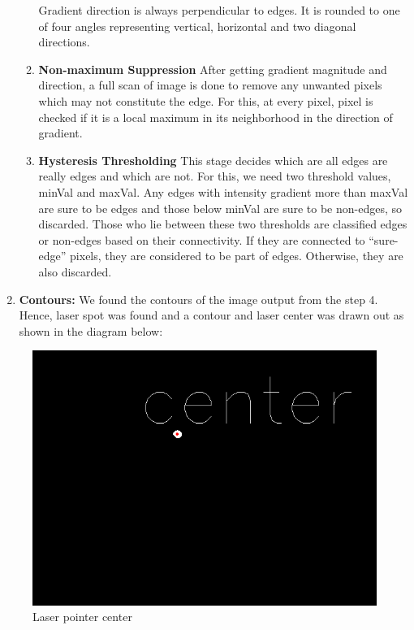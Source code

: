 \documentclass[12pt, a4paper]{article}
\begin{document}
\begin{enumerate}
\begin{enumerate}
Gradient direction is always perpendicular to edges. It is rounded to one of four angles   representing vertical, horizontal and two diagonal directions.
\item \textbf{Non-maximum Suppression}
After getting gradient magnitude and direction, a full scan of image is done to remove any unwanted pixels which may not constitute the edge. For this, at every pixel, pixel is checked ­if it is a local maximum in its neighborhood in the direction of gradient.

\item \textbf{Hysteresis Thresholding}
This stage decides which are all edges are really edges and which are not. For this, we need two threshold values, minVal and maxVal. Any edges with intensity gradient more than maxVal are sure to be edges and those below minVal are sure to be non-edges, so discarded. Those who lie between these two thresholds are classified edges or non-edges based on their connectivity. If they are connected to “sure-edge” pixels, they are considered to be part of edges. Otherwise, they are also discarded.
\end{enumerate}

	\item \textbf{Contours:}
		We found the contours of the image output from the step 4. Hence, laser spot was found and a contour and laser center was drawn out as shown in the diagram below:
\end{enumerate}

\begin{figure}[htp]
	\centering
	\includegraphics[scale = 0.6]{center.png}
	\caption{Laser pointer center}
	\label{}
\end{figure}
\end{document}
